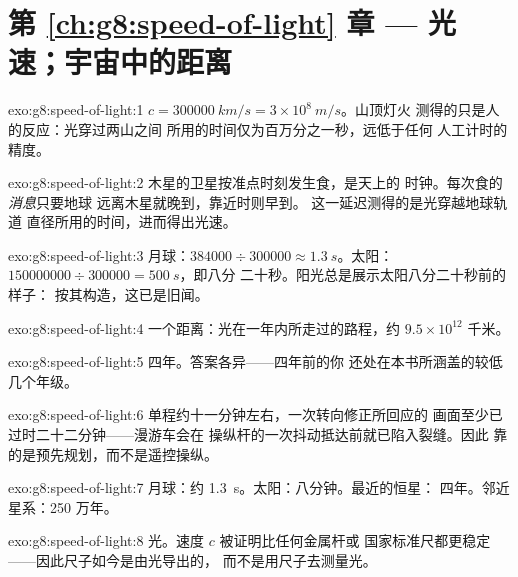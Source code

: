 \section*{第 \ref{ch:g8:speed-of-light} 章 --- 光速；宇宙中的距离}

\begin{solution}{exo:g8:speed-of-light:1}
$c = \qty{300000}{km/s} = 3 \times 10^{8}\ \unit{m/s}$。山顶灯火
测得的只是人的反应：光穿过两山之间
所用的时间仅为百万分之一秒，远低于任何
人工计时的精度。
\end{solution}

\begin{solution}{exo:g8:speed-of-light:2}
木星的卫星按准点时刻发生食，是天上的
时钟。每次食的\emph{消息}只要地球
远离木星就晚到，靠近时则早到。
这一延迟测得的是光穿越地球轨道
直径所用的时间，进而得出光速。
\end{solution}

\begin{solution}{exo:g8:speed-of-light:3}
月球：$384000 \div 300000 \approx \qty{1.3}{s}$。太阳：
$150000000 \div 300000 = \qty{500}{s}$，即八分
二十秒。阳光总是展示太阳八分二十秒前的样子：
按其构造，这已是旧闻。
\end{solution}

\begin{solution}{exo:g8:speed-of-light:4}
一个距离：光在一年内所走过的路程，约
$9.5 \times 10^{12}$ 千米。
\end{solution}

\begin{solution}{exo:g8:speed-of-light:5}
四年。答案各异——四年前的你
还处在本书所涵盖的较低几个年级。
\end{solution}

\begin{solution}{exo:g8:speed-of-light:6}
单程约十一分钟左右，一次转向修正所回应的
画面至少已过时二十二分钟——漫游车会在
操纵杆的一次抖动抵达前就已陷入裂缝。因此
靠的是预先规划，而不是遥控操纵。
\end{solution}

\begin{solution}{exo:g8:speed-of-light:7}
月球：约 \qty{1.3}{s}。太阳：八分钟。最近的恒星：
四年。邻近星系：250 万年。
\end{solution}

\begin{solution}{exo:g8:speed-of-light:8}
光。速度 $c$ 被证明比任何金属杆或
国家标准尺都更稳定——因此尺子如今是由光导出的，
而不是用尺子去测量光。
\end{solution}

